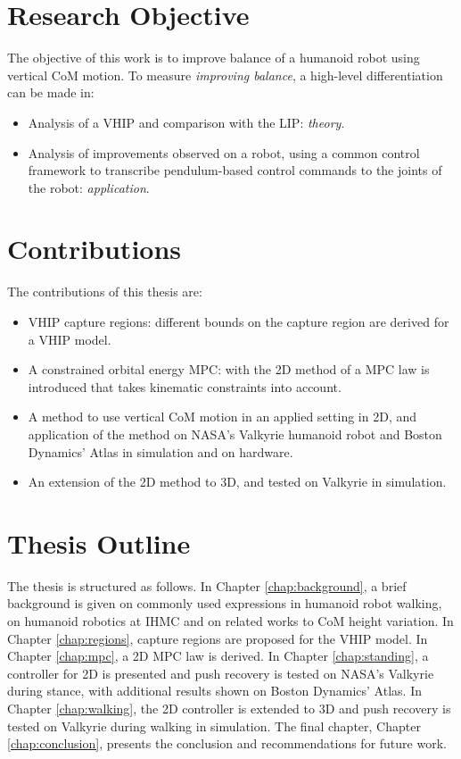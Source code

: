 \section{Research Objective}
The objective of this work is to improve balance of a humanoid robot using vertical \ac{CoM} motion. To measure \textit{improving balance}, a high-level differentiation can be made in:
\begin{itemize}
	\item Analysis of a \ac{VHIP} and comparison with the \ac{LIP}: \textit{theory}.
	\item Analysis of improvements observed on a robot, using a common control framework to transcribe pendulum-based control commands to the joints of the robot: \textit{application}.
\end{itemize}

\section{Contributions}
The contributions of this thesis are:
\begin{itemize}
	\item \ac{VHIP} capture regions: different bounds on  the capture region are derived for a \ac{VHIP} model. 
      \item A constrained orbital energy \ac{MPC}: with the \ac{2D} method of \cite{koolen2016balance} a \ac{MPC} law is introduced that takes kinematic constraints into account.
	\item A method to use vertical \ac{CoM} motion in an applied setting in \ac{2D}, and application of the method on NASA's Valkyrie humanoid robot and Boston Dynamics' Atlas in simulation and on hardware.
	\item An extension of the \ac{2D} method to \ac{3D}, and tested on Valkyrie in simulation.
\end{itemize}
\section{Thesis Outline}
The thesis is structured as follows. In Chapter \ref{chap:background}, a brief background is given on commonly used expressions in humanoid robot walking, on humanoid robotics at \ac{IHMC} and on related works to \ac{CoM} height variation. In Chapter \ref{chap:regions}, capture regions are proposed for the \ac{VHIP} model. In Chapter \ref{chap:mpc}, a \ac{2D} \ac{MPC} law is derived. In Chapter \ref{chap:standing}, a controller for \ac{2D} is presented and push recovery is tested on NASA's Valkyrie during stance, with additional results shown on Boston Dynamics' Atlas. In Chapter \ref{chap:walking}, the \ac{2D} controller is extended to \ac{3D} and push recovery is tested on Valkyrie during walking in simulation. The final chapter, Chapter \ref{chap:conclusion}, presents the conclusion and recommendations for future work.

